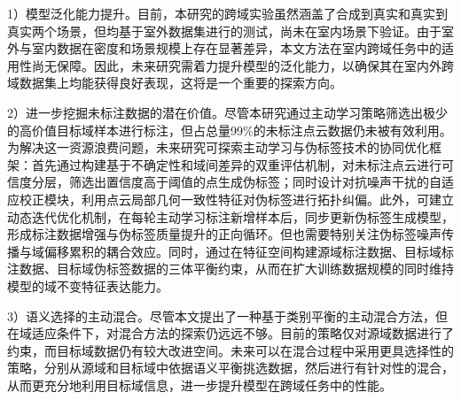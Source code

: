 1）模型泛化能力提升。目前，本研究的跨域实验虽然涵盖了合成到真实和真实到真实两个场景，但均基于室外数据集进行的测试，尚未在室内场景下验证。由于室外与室内数据在密度和场景规模上存在显著差异，本文方法在室内跨域任务中的适用性尚无保障。因此，未来研究需着力提升模型的泛化能力，以确保其在室内外跨域数据集上均能获得良好表现，这将是一个重要的探索方向。

2）进一步挖掘未标注数据的潜在价值。尽管本研究通过主动学习策略筛选出极少的高价值目标域样本进行标注，但占总量99\%的未标注点云数据仍未被有效利用。为解决这一资源浪费问题，未来研究可探索主动学习与伪标签技术的协同优化框架：首先通过构建基于不确定性和域间差异的双重评估机制，对未标注点云进行可信度分层，筛选出置信度高于阈值的点生成伪标签；同时设计对抗噪声干扰的自适应校正模块，利用点云局部几何一致性特征对伪标签进行拓扑纠偏。此外，可建立动态迭代优化机制，在每轮主动学习标注新增样本后，同步更新伪标签生成模型，形成标注数据增强与伪标签质量提升的正向循环。但也需要特别关注伪标签噪声传播与域偏移累积的耦合效应。同时，通过在特征空间构建源域标注数据、目标域标注数据、目标域伪标签数据的三体平衡约束，从而在扩大训练数据规模的同时维持模型的域不变特征表达能力。

3）语义选择的主动混合。尽管本文提出了一种基于类别平衡的主动混合方法，但在域适应条件下，对混合方法的探索仍远远不够。目前的策略仅对源域数据进行了约束，而目标域数据仍有较大改进空间。未来可以在混合过程中采用更具选择性的策略，分别从源域和目标域中依据语义平衡挑选数据，然后进行有针对性的混合，从而更充分地利用目标域信息，进一步提升模型在跨域任务中的性能。

